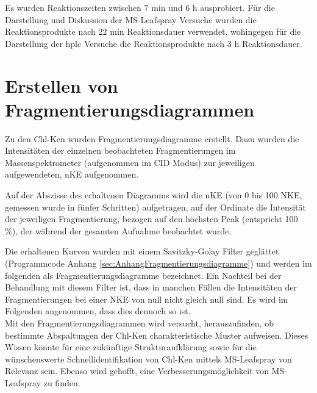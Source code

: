 Es wurden Reaktionszeiten zwischen 7 min und 6 h ausprobiert. Für die Darstellung und Diskussion der MS-Leafspray Versuche wurden die Reaktionsprodukte nach 22 min Reaktionsdauer verwendet, wohingegen für die Darstellung der \gls{hplc} Versuche die Reaktionsprodukte nach 3 h Reaktionsdauer.

\section{Erstellen von Fragmentierungsdiagrammen} \label{sec:fragmentierungsdiagramme}

Zu den \gls{Chl-K}en wurden Fragmentierungsdiagramme erstellt. Dazu wurden die Intensitäten der einzelnen beobachteten Fragmentierungen im Massenspektrometer (aufgenommen im CID Modus) zur jeweiligen aufgewendeten, \gls{nKE} aufgenommen. 

Auf der Abszisse des erhaltenen Diagramms wird die \gls{nKE} (von 0 bis 100 NKE, gemessen wurde in fünfer Schritten) aufgetragen, auf der Ordinate die Intensität der jeweiligen Fragmentierung, bezogen auf den höchsten Peak (entspricht 100 \%), der während der gesamten Aufnahme beobachtet wurde. 

Die erhaltenen Kurven wurden mit einem Savitzky-Golay Filter \cite{scipy} geglättet (Programmcode Anhang \ref{sec:AnhangFragmentierungsdiagramme}) und werden im folgenden als Fragmentierungsdiagramme bezeichnet. Ein Nachteil bei der Behandlung mit diesem Filter ist, dass in manchen Fällen die Intensitäten der Fragmentierungen bei einer NKE von null nicht gleich null sind. Es wird im Folgenden angenommen, dass dies dennoch so ist. \\

Mit den Fragmentierungsdiagrammen wird versucht, herauszufinden, ob bestimmte Abspaltungen der \gls{Chl-K}en charakteristische Muster aufweisen. Dieses Wissen könnte für eine zukünftige Strukturaufklärung sowie für die wünschenswerte Schnellidentifikation von \gls{Chl-K}en mittels MS-Leafspray von Relevanz sein. Ebenso wird gehofft, eine Verbesserungsmöglichkeit von MS-Leafspray zu finden.